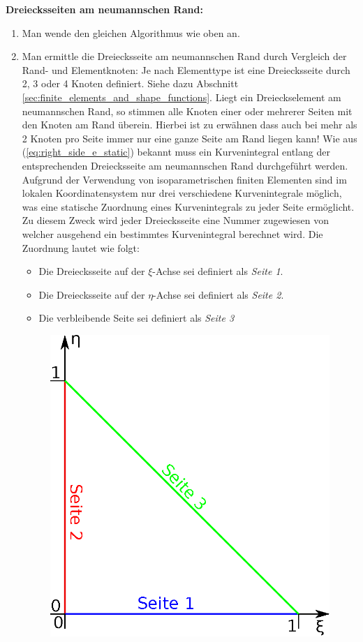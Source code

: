 \textbf{Dreiecksseiten am neumannschen Rand:}
\begin{enumerate}
	\item Man wende den gleichen Algorithmus wie oben an.
	\item Man ermittle die Dreiecksseite am neumannschen Rand durch Vergleich der Rand- und Elementknoten:\newline
	Je nach Elementtype ist eine Dreiecksseite durch 2, 3 oder 4 Knoten definiert. Siehe dazu Abschnitt \ref{sec:finite_elements_and_shape_functions}. Liegt ein Dreieckselement am neumannschen Rand, so stimmen alle Knoten einer oder mehrerer Seiten mit den Knoten am Rand überein. Hierbei ist zu erwähnen dass auch bei mehr als 2 Knoten pro Seite immer nur eine ganze Seite am Rand liegen kann! \newline
	Wie aus (\ref{eq:right_side_e_static}) bekannt muss ein Kurvenintegral entlang der entsprechenden Dreiecksseite am neumannschen Rand durchgeführt werden. Aufgrund der Verwendung von isoparametrischen finiten Elementen sind im lokalen Koordinatensystem nur drei verschiedene Kurvenintegrale möglich, was eine statische Zuordnung eines Kurvenintegrals zu jeder Seite ermöglicht. Zu diesem Zweck wird jeder Dreiecksseite eine Nummer zugewiesen von welcher ausgehend ein bestimmtes Kurvenintegral berechnet wird. Die Zuordnung lautet wie folgt:
	\begin{itemize}
		\item Die Dreiecksseite auf der $\xi$-Achse sei definiert als \textit{Seite 1}.
		\item Die Dreiecksseite auf der $\eta$-Achse sei definiert als \textit{Seite 2}.
		\item Die verbleibende Seite sei definiert als \textit{Seite 3}
	\end{itemize}
	\begin{figure}[H]
		\begin{center}
			\includegraphics[scale=0.65]{pics/triangle_side_assignment.eps}

\end{center}
\end{figure}
\end{enumerate}
